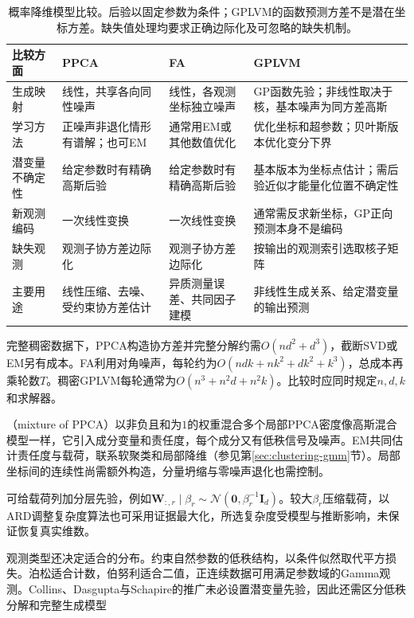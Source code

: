 \begin{table}[htbp]
\centering
\small
\begin{tabularx}{\linewidth}{@{}>{\RaggedRight\arraybackslash}p{20mm}>{\RaggedRight\arraybackslash}X>{\RaggedRight\arraybackslash}X>{\RaggedRight\arraybackslash}X@{}}
\toprule
比较方面 & PPCA & FA & GPLVM \\
\midrule
生成映射 & 线性，共享各向同性噪声 & 线性，各观测坐标独立噪声 & GP函数先验；非线性取决于核，基本噪声为同方差高斯 \\
学习方法 & 正噪声非退化情形有谱解；也可EM & 通常用EM或其他数值优化 & 优化坐标和超参数；贝叶斯版本优化变分下界 \\
潜变量不确定性 & 给定参数时有精确高斯后验 & 给定参数时有精确高斯后验 & 基本版本为坐标点估计；需后验近似才能量化位置不确定性 \\
新观测编码 & 一次线性变换 & 一次线性变换 & 通常需反求新坐标，GP正向预测本身不是编码 \\
缺失观测 & 观测子协方差边际化 & 观测子协方差边际化 & 按输出的观测索引选取核子矩阵 \\
主要用途 & 线性压缩、去噪、受约束协方差估计 & 异质测量误差、共同因子建模 & 非线性生成关系、给定潜变量的输出预测 \\
\bottomrule
\end{tabularx}
\caption{概率降维模型比较。后验以固定参数为条件；GPLVM的函数预测方差不是潜在坐标方差。缺失值处理均要求正确边际化及可忽略的缺失机制。}
\label{tab:dim-probabilistic-comparison}
\end{table}

完整稠密数据下，PPCA构造协方差并完整分解约需$O(nd^2+d^3)$，截断SVD或EM另有成本。FA利用对角噪声，每轮约为$O(ndk+nk^2+dk^2+k^3)$，总成本再乘轮数$T$。稠密GPLVM每轮通常为$O(n^3+n^2d+n^2k)$。比较时应同时规定$n,d,k$和求解器。

（mixture of PPCA）以非负且和为$1$的权重混合多个局部PPCA密度像高斯混合模型一样，它引入成分变量和责任度，每个成分又有低秩信号及噪声。EM共同估计责任度与载荷，联系软聚类和局部降维（参见第\ref{sec:clustering-gmm}节）。局部坐标间的连续性尚需额外构造，分量坍缩与零噪声退化也需控制。

可给载荷列加分层先验，例如$\bm{W}_{:,r}\mid\beta_r\sim\mathcal{N}(\bm{0},\beta_r^{-1}\bm{I}_d)$。较大$\beta_r$压缩载荷，以ARD调整复杂度算法也可采用证据最大化，所选复杂度受模型与推断影响，未保证恢复真实维数。

观测类型还决定适合的分布。约束自然参数的低秩结构，以条件似然取代平方损失。泊松适合计数，伯努利适合二值，正连续数据可用满足参数域的Gamma观测。Collins、Dasgupta与Schapire的推广未必设置潜变量先验，因此还需区分低秩分解和完整生成模型

